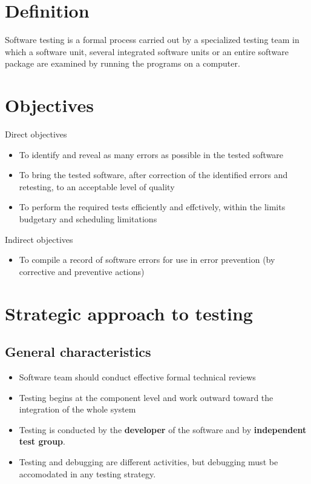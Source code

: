 \documentclass{article}
\begin{document}
\tableofcontents

\newpage

\section{Definition}

\begin{flushleft}
Software testing is a formal process carried out by a specialized testing team in which a software unit, several integrated software units or an entire software package are examined by running the programs on a computer.
\end{flushleft}

\section{Objectives}

\begin{flushleft}
Direct objectives
\begin{itemize}
  \item To identify and reveal as many errors as possible in the tested software
  \item To bring the tested software, after correction of the identified errors and retesting, to an acceptable level of quality
  \item To perform the required tests efficiently and effctively, within the limits budgetary and scheduling limitations
\end{itemize}
Indirect objectives
\begin{itemize}
  \item To compile a record of software errors for use in error prevention (by corrective and preventive actions)
\end{itemize}
\end{flushleft}

\section{Strategic approach to testing}

\subsection{General characteristics}
\begin{itemize}
  \item Software team should conduct effective formal technical reviews
  \item Testing begins at the component level and work outward toward the integration of the whole system
  \item Testing is conducted by the \textbf{developer} of the software and by \textbf{independent test group}.
  \item Testing and debugging are different activities, but debugging must be accomodated in any testing strategy.
\end{itemize}
\end{document}
